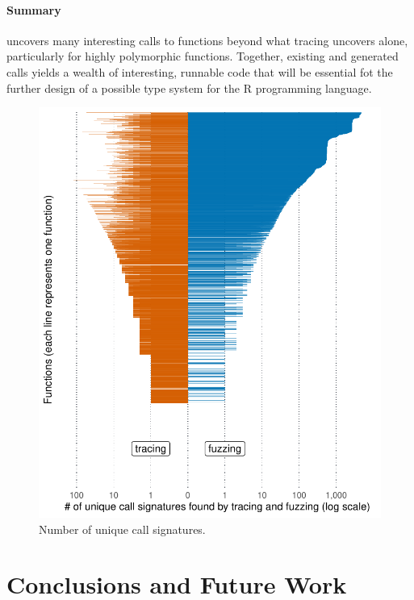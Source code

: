 \documentclass[sigplan,nonacm,anonymous,review]{acmart}
\begin{document}
\paragraph{Summary}

\tool uncovers many interesting calls to functions beyond what tracing uncovers alone, particularly for highly polymorphic functions.
Together, existing and generated calls yields a wealth of interesting, runnable code that will be essential fot the further design of a possible type system for the R programming language.


\begin{figure}
    \centering
    \includegraphics[width=\columnwidth]{code-and-figures/uf-call-signatures.pdf}
    \caption{Number of unique call signatures.}
    \label{fig:call-signatures}
\end{figure}

\section{Conclusions and Future Work}
\label{sec:conclusions}
\end{document}
